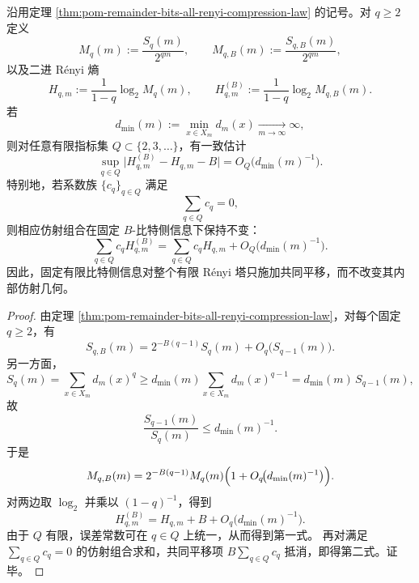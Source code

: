 \begin{theorem}\label{thm:xi-time-part47ca-remainder-bits-renyi-affine-shift}
沿用定理 \ref{thm:pom-remainder-bits-all-renyi-compression-law} 的记号。对 \(q\ge 2\) 定义
\[
M_q(m):=\frac{S_q(m)}{2^{qm}},
\qquad
M_{q,B}(m):=\frac{S_{q,B}(m)}{2^{qm}},
\]
以及二进 Rényi 熵
\[
H_{q,m}:=\frac{1}{1-q}\log_2 M_q(m),
\qquad
H_{q,m}^{(B)}:=\frac{1}{1-q}\log_2 M_{q,B}(m).
\]
若
\[
d_{\min}(m):=\min_{x\in X_m}d_m(x)\xrightarrow[m\to\infty]{}\infty,
\]
则对任意有限指标集 \(Q\subset\{2,3,\dots\}\)，有一致估计
\[
\sup_{q\in Q}\bigl|H_{q,m}^{(B)}-H_{q,m}-B\bigr|
=
O_Q\!\bigl(d_{\min}(m)^{-1}\bigr).
\]
特别地，若系数族 \(\{c_q\}_{q\in Q}\) 满足
\[
\sum_{q\in Q}c_q=0,
\]
则相应仿射组合在固定 \(B\)-比特侧信息下保持不变：
\[
\sum_{q\in Q}c_q H_{q,m}^{(B)}
=
\sum_{q\in Q}c_q H_{q,m}
 + O_Q\!\bigl(d_{\min}(m)^{-1}\bigr).
\]
因此，固定有限比特侧信息对整个有限 Rényi 塔只施加共同平移，而不改变其内部仿射几何。
\end{theorem}

\begin{proof}
由定理 \ref{thm:pom-remainder-bits-all-renyi-compression-law}，对每个固定 \(q\ge 2\)，有
\[
S_{q,B}(m)=2^{-B(q-1)}S_q(m)+O_q\!\bigl(S_{q-1}(m)\bigr).
\]
另一方面，
\[
S_q(m)=\sum_{x\in X_m}d_m(x)^q
\ge
d_{\min}(m)\sum_{x\in X_m}d_m(x)^{q-1}
=
d_{\min}(m)\,S_{q-1}(m),
\]
故
\[
\frac{S_{q-1}(m)}{S_q(m)}\le d_{\min}(m)^{-1}.
\]
于是
\[
M_{q,B}(m)
=
2^{-B(q-1)}M_q(m)\Bigl(1+O_q\!\bigl(d_{\min}(m)^{-1}\bigr)\Bigr).
\]
对两边取 \(\log_2\) 并乘以 \((1-q)^{-1}\)，得到
\[
H_{q,m}^{(B)}=H_{q,m}+B+O_q\!\bigl(d_{\min}(m)^{-1}\bigr).
\]
由于 \(Q\) 有限，误差常数可在 \(q\in Q\) 上统一，从而得到第一式。
再对满足 \(\sum_{q\in Q}c_q=0\) 的仿射组合求和，共同平移项 \(B\sum_{q\in Q}c_q\) 抵消，即得第二式。证毕。
\end{proof}

\endinput
